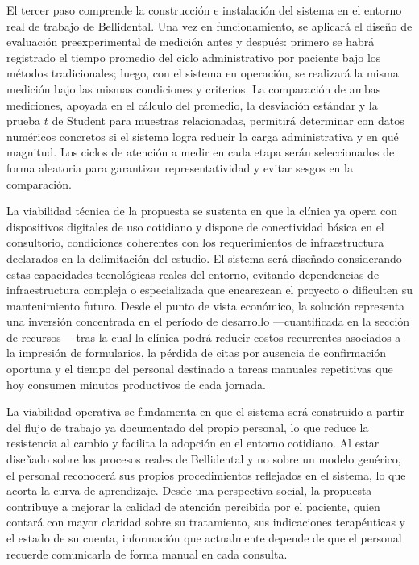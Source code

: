 El tercer paso comprende la construcción e instalación del sistema
en el entorno real de trabajo de Bellidental. Una vez en
funcionamiento, se aplicará el diseño de evaluación preexperimental
de medición antes y después: primero se habrá registrado el tiempo
promedio del ciclo administrativo por paciente bajo los métodos
tradicionales; luego, con el sistema en operación, se realizará
la misma medición bajo las mismas condiciones y criterios. La
comparación de ambas mediciones, apoyada en el cálculo del
promedio, la desviación estándar y la prueba $t$ de Student para
muestras relacionadas, permitirá determinar con datos numéricos
concretos si el sistema logra reducir la carga administrativa y en
qué magnitud. Los ciclos de atención a medir en cada etapa serán
seleccionados de forma aleatoria para garantizar representatividad
y evitar sesgos en la comparación.

La viabilidad técnica de la propuesta se sustenta en que la
clínica ya opera con dispositivos digitales de uso cotidiano y
dispone de conectividad básica en el consultorio, condiciones
coherentes con los requerimientos de infraestructura declarados en
la delimitación del estudio. El sistema será diseñado considerando
estas capacidades tecnológicas reales del entorno, evitando
dependencias de infraestructura compleja o especializada que
encarezcan el proyecto o dificulten su mantenimiento futuro.
Desde el punto de vista económico, la solución representa una
inversión concentrada en el período de desarrollo —cuantificada en
la sección de recursos— tras la cual la clínica podrá reducir
costos recurrentes asociados a la impresión de formularios, la
pérdida de citas por ausencia de confirmación oportuna y el tiempo
del personal destinado a tareas manuales repetitivas que hoy
consumen minutos productivos de cada jornada.

La viabilidad operativa se fundamenta en que el sistema será
construido a partir del flujo de trabajo ya documentado del propio
personal, lo que reduce la resistencia al cambio y facilita la
adopción en el entorno cotidiano. Al estar diseñado sobre los
procesos reales de Bellidental y no sobre un modelo genérico, el
personal reconocerá sus propios procedimientos reflejados en el
sistema, lo que acorta la curva de aprendizaje. Desde una
perspectiva social, la propuesta contribuye a mejorar la calidad
de atención percibida por el paciente, quien contará con mayor
claridad sobre su tratamiento, sus indicaciones terapéuticas y el
estado de su cuenta, información que actualmente depende de que
el personal recuerde comunicarla de forma manual en cada consulta.